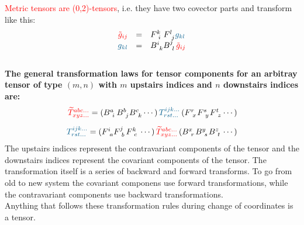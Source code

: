 \textcolor{red}{Metric tensors are (0,2)-tensors}, i.e. they have two covector parts and
transform like this:
\begin{equation}
    \begin{array}{rcl}
        \textcolor{red}{\tilde{g}_{ij}} & = &
        F^{k~}_{~i}  F^{l~}_{~j} \textcolor{MidnightBlue}{{g}_{kl}} \\
        \textcolor{MidnightBlue}{g_{kl}} & = &
        B^{i~}_{~k} B^{j~}_{~l} \textcolor{red}{\tilde{g}_{ij}}
    \end{array}
\end{equation} \\

\textbf{The general transformation laws for tensor components for an arbitray tensor of type
$(m,n)$ with $m$ upstairs indices and $n$ downstairs indices are:}
\begin{equation}
    \begin{array}{rcl}
        \textcolor{red}{\widetilde{T}^{abc...}_{xyz...}} =
            (B^{a~}_{~i} B^{b~}_{~j} B^{c~}_{~k} \cdots)
            \,\textcolor{MidnightBlue}{T^{ijk...}_{rst...}}\,
            (F^{r~}_{~x} F^{s~}_{~y} F^{t~}_{~z} \cdots) \\
        \noalign{\vskip10pt}
        \textcolor{MidnightBlue}{T^{ijk...}_{rst...}} =
            (F^{i~}_{~a} F^{j~}_{~b} F^{k~}_{~c} \cdots)
            \,\textcolor{red}{\widetilde{T}^{abc...}_{xyz...}}\,
            (B^{x~}_{~r} B^{y~}_{~s} B^{z~}_{~t} \cdots)
    \end{array}
\end{equation}
The upstairs indices represent the contravariant components of the tensor and the
downstairs indices represent the covariant components of the tensor. The transformation
itself is a series of backward and forward transforms. To go from old to new system the
covariant componens use forward transformations, while the contravariant components use
backward transformations. \\

Anything that follows these transformation rules during change of coordinates is a tensor.

\newpage